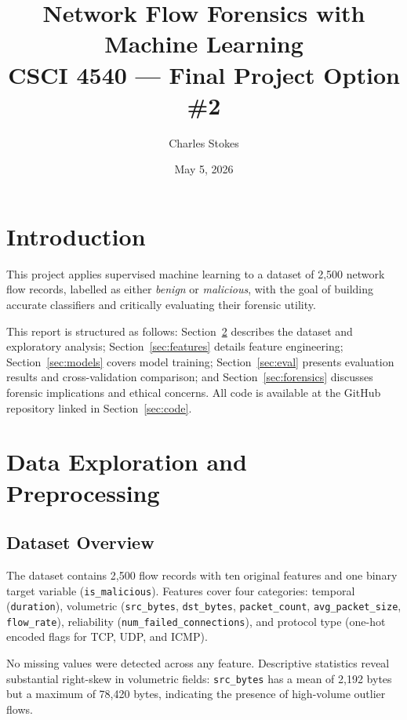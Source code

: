 \documentclass[11pt]{article}
\title{\textbf{Network Flow Forensics with Machine Learning}\\
       \large CSCI 4540 --- Final Project Option \#2}
\author{Charles Stokes}
\date{May 5, 2026}
\begin{document}
\maketitle
\thispagestyle{empty}

\section{Introduction}

This project applies supervised machine learning
to a dataset of 2,500 network flow records, labelled as either \emph{benign} or
\emph{malicious}, with the goal of building accurate classifiers and critically
evaluating their forensic utility.

This report is structured as follows: Section~\ref{sec:eda}
describes the dataset and exploratory analysis; Section~\ref{sec:features}
details feature engineering; Section~\ref{sec:models} covers model training;
Section~\ref{sec:eval} presents evaluation results and cross-validation
comparison; and Section~\ref{sec:forensics} discusses forensic implications and
ethical concerns. All code is available at the GitHub repository linked in
Section~\ref{sec:code}.

\section{Data Exploration and Preprocessing}
\label{sec:eda}

\subsection{Dataset Overview}

The dataset contains 2,500 flow records with ten original features and one
binary target variable (\texttt{is\_malicious}). Features cover four
categories: temporal (\texttt{duration}), volumetric (\texttt{src\_bytes},
\texttt{dst\_bytes}, \texttt{packet\_count}, \texttt{avg\_packet\_size},
\texttt{flow\_rate}), reliability (\texttt{num\_failed\_connections}), and
protocol type (one-hot encoded flags for TCP, UDP, and ICMP).

No missing values were detected across any feature. Descriptive statistics
reveal substantial right-skew in volumetric fields: \texttt{src\_bytes} has
a mean of 2,192 bytes but a maximum of 78,420 bytes, indicating the presence
of high-volume outlier flows. 
\end{document}
